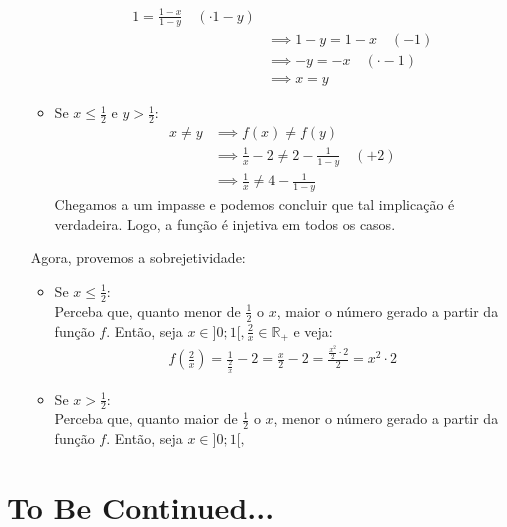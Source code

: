 \documentclass[13pt,letterpaper]{article}
\begin{document}
\begin{enumerate}
\begin{itemize}
\begin{align*}
                1 = \frac{1 - x}{1 - y} \quad (\cdot 1 - y) \\ &\implies 
                1 - y = 1 - x \quad (-1) \\ &\implies
                -y = -x \quad (\cdot -1) \\ &\implies 
                x = y
            \end{align*}
        \item Se $x \le \frac{1}{2}$ e $y > \frac{1}{2}$:
            \begin{align*}
                x \ne y &\implies f(x) \ne f(y) \\ &\implies
                \frac{1}{x} - 2 \ne 2 - \frac{1}{1 - y} \quad (+2) \\ &\implies
                \frac{1}{x} \ne 4 - \frac{1}{1 - y}
            \end{align*}
            Chegamos a um impasse e podemos concluir que tal implicação é verdadeira. Logo, a função é injetiva em todos os casos.
    \end{itemize}
    Agora, provemos a sobrejetividade:
    \begin{itemize}
        \item Se $x \le \frac{1}{2}$: \\
        Perceba que, quanto menor de $\frac{1}{2}$ o $x$, maior o número gerado a partir da função $f$. Então, seja $x \in ]0; 1[, \frac{2}{x} \in \mathbb{R}_+$ e veja:
            \begin{align*}
                f(\frac{2}{x}) = \frac{1}{\frac{2}{x}} - 2 = \frac{x}{2} - 2 = \frac{\frac{x^2}{2} \cdot 2}{2} 
                = x^2 \cdot 2
            \end{align*}
        \item Se $x > \frac{1}{2}$: \\
        Perceba que, quanto maior de $\frac{1}{2}$ o $x$, menor o número gerado a partir da função $f$. Então, seja $x \in ]0; 1[, \frac{}{}$
        
    \end{itemize}
    
\end{enumerate}
\newpage
\section{To Be Continued...}
\end{document}
